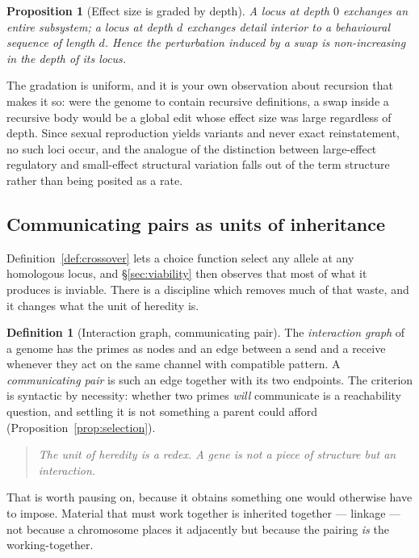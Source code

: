 \documentclass[11pt]{article}
\theoremstyle{plain}
\newtheorem{proposition}[theorem]{Proposition}
\theoremstyle{definition}
\newtheorem{definition}[theorem]{Definition}
\begin{document}
\begin{proposition}[Effect size is graded by depth]
\label{prop:depthgrade}
A locus at depth $0$ exchanges an entire subsystem; a locus at depth $d$ exchanges detail interior to
a behavioural sequence of length $d$. Hence the perturbation induced by a swap is non-increasing in
the depth of its locus.
\end{proposition}

The gradation is uniform, and it is your own observation about recursion that makes it so: were the
genome to contain recursive definitions, a swap inside a recursive body would be a global edit whose
effect size was large regardless of depth. Since sexual reproduction yields variants and never exact
reinstatement, no such loci occur, and the analogue of the distinction between large-effect regulatory
and small-effect structural variation falls out of the term structure rather than being posited as a
rate.

\subsection{Communicating pairs as units of inheritance}
\label{sec:pairs}

Definition~\ref{def:crossover} lets a choice function select any allele at any homologous locus, and
\S\ref{sec:viability} then observes that most of what it produces is inviable. There is a discipline
which removes much of that waste, and it changes what the unit of heredity is.

\begin{definition}[Interaction graph, communicating pair]
\label{def:intgraph}
The \emph{interaction graph} of a genome has the primes as nodes and an edge between a send and a
receive whenever they act on the same channel with compatible pattern. A \emph{communicating pair} is
such an edge together with its two endpoints. The criterion is syntactic by necessity: whether two
primes \emph{will} communicate is a reachability question, and settling it is not something a parent
could afford (Proposition~\ref{prop:selection}).
\end{definition}

\begin{quote}
\itshape The unit of heredity is a redex. A gene is not a piece of structure but an interaction.
\end{quote}

That is worth pausing on, because it obtains something one would otherwise have to impose. Material
that must work together is inherited together --- linkage --- not because a chromosome places it
adjacently but because the pairing \emph{is} the working-together.
\end{document}
